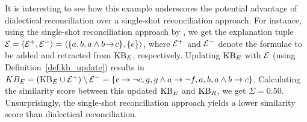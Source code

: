 \documentclass{article}
\begin{document}
\begin{example}
\noindent It is interesting to see how this example underscores the potential advantage of dialectical reconciliation over a single-shot reconciliation approach. For instance, using the single-shot reconciliation approach by \citet{vasileioulogic}, we get the explanation tuple $\mathcal{E} = \langle \mathcal{E}^+, \mathcal{E}^- \rangle = \langle \{ a, b, a\land b \!\rightarrow\! c \}, \{e\} \rangle$, where $\mathcal{E}^+$ and $\mathcal{E}^-$ denote the formulae to be added and retracted from $\mathrm{KB}_E$, respectively. Updating $\mathrm{KB}_E$ with $\mathcal{E}$ (using Definition~\ref{def:kb_update}) results in $KB_E = (\mathrm{KB}_E \cup \mathcal{E}^+)\setminus \mathcal{E}^- = \{e \rightarrow \lnot c, g, g\land a \rightarrow \lnot f, a, b, a \land b \rightarrow c \}$. Calculating the similarity score between this updated $\mathrm{KB}_E$ and $\mathrm{KB}_R$, we get $\Sigma = 0.50$. Unsurprisingly, the single-shot reconciliation approach yields a lower similarity score than dialectical reconciliation.
\end{example}
\end{document}
